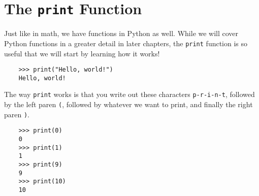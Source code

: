 
\section{The \texttt{print} Function}

Just like in math, we have functions in Python as well. While we will cover Python functions in a
greater detail in later chapters, the \texttt{print} function is so useful that we will
start by learning how it works!

\begin{verbatim}
    >>> print("Hello, world!")
    Hello, world!
\end{verbatim}

The way \texttt{print} works is that you write out these characters
\texttt{p-r-i-n-t}, followed by the left paren \texttt{(}, followed by
whatever we want to print, and finally the right paren \texttt{)}.

\begin{verbatim}
    >>> print(0)
    0
    >>> print(1)
    1
    >>> print(9)
    9
    >>> print(10)
    10
\end{verbatim}
